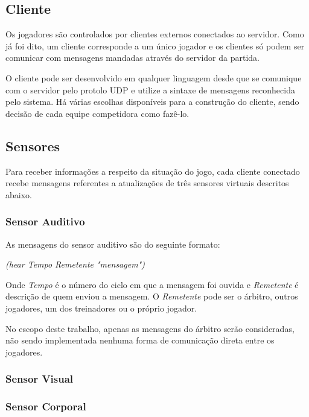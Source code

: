 \subsection{Cliente}
\par Os jogadores são controlados por clientes externos conectados ao servidor. Como já foi dito, um cliente corresponde a um único jogador e os clientes só podem ser comunicar com mensagens mandadas através do servidor da partida.
\par O cliente pode ser desenvolvido em qualquer linguagem desde que se comunique com o servidor pelo protolo UDP e utilize a sintaxe de mensagens reconhecida pelo sistema. Há várias escolhas disponíveis para a construção do cliente, sendo decisão de cada equipe competidora como fazê-lo.

\subsection{Sensores}

Para receber informações a respeito da situação do jogo, cada cliente conectado recebe mensagens referentes a atualizações de três sensores virtuais descritos abaixo.

\subsubsection{Sensor Auditivo}

As mensagens do sensor auditivo são do seguinte formato:

\textit{(hear Tempo Remetente "mensagem")}

Onde \textit{Tempo} é o número do ciclo em que a mensagem foi ouvida e \textit{Remetente} é descrição de quem enviou a mensagem. O \textit{Remetente} pode ser o árbitro, outros jogadores, um dos treinadores ou o próprio jogador.

No escopo deste trabalho, apenas as mensagens do árbitro serão consideradas, não sendo implementada nenhuma forma de comunicação direta entre os jogadores.

\subsubsection{Sensor Visual}


\subsubsection{Sensor Corporal}

